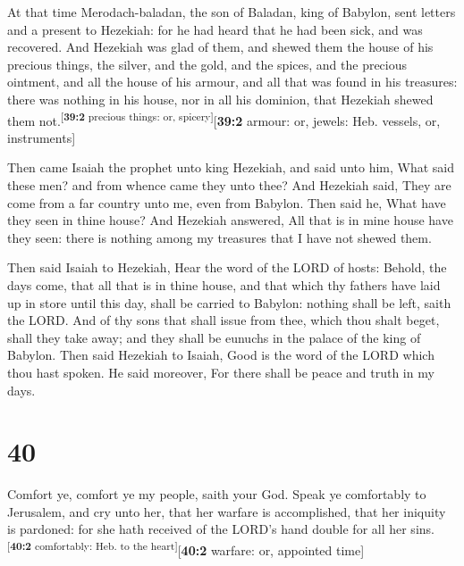  At that time Merodach-baladan, the son of Baladan, king
of Babylon, sent letters and a present to Hezekiah: for he had heard
that he had been sick, and was recovered.  And Hezekiah
was glad of them, and shewed them the house of his precious things, the
silver, and the gold, and the spices, and the precious ointment, and all
the house of his armour, and all that was found in his treasures: there
was nothing in his house, nor in all his dominion, that Hezekiah shewed
them not.\textsuperscript{{[}\textbf{39:2} precious things: or,
spicery{]}}{[}\textbf{39:2} armour: or, jewels: Heb. vessels, or,
instruments{]}

 Then came Isaiah the prophet unto king Hezekiah, and said
unto him, What said these men? and from whence came they unto thee? And
Hezekiah said, They are come from a far country unto me, even from
Babylon.  Then said he, What have they seen in thine
house? And Hezekiah answered, All that is in mine house have they seen:
there is nothing among my treasures that I have not shewed them.

 Then said Isaiah to Hezekiah, Hear the word of the LORD
of hosts:  Behold, the days come, that all that is in
thine house, and that which thy fathers have laid up in store until this
day, shall be carried to Babylon: nothing shall be left, saith the LORD.
 And of thy sons that shall issue from thee, which thou
shalt beget, shall they take away; and they shall be eunuchs in the
palace of the king of Babylon.  Then said Hezekiah to
Isaiah, Good is the word of the LORD which thou hast spoken. He said
moreover, For there shall be peace and truth in my days.

\hypertarget{section-39}{%
\section{40}\label{section-39}}

 Comfort ye, comfort ye my people, saith your God.
 Speak ye comfortably to Jerusalem, and cry unto her, that
her warfare is accomplished, that her iniquity is pardoned: for she hath
received of the LORD's hand double for all her
sins.\textsuperscript{{[}\textbf{40:2} comfortably: Heb. to the
heart{]}}{[}\textbf{40:2} warfare: or, appointed time{]}

